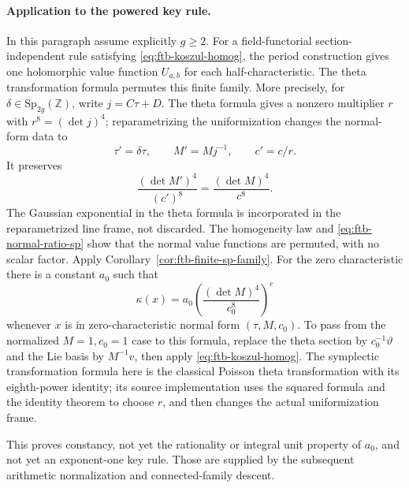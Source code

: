 \paragraph{Application to the powered key rule.}
In this paragraph assume explicitly \(g\geq2\).
For a field-functorial section-independent rule satisfying
\eqref{eq:ftb-koszul-homog}, the period construction gives one
holomorphic value function \(U_{a,b}\) for each half-characteristic.
The theta transformation formula permutes this finite family.
More precisely, for \(\delta\in\mathrm{Sp}_{2g}(\mathbb Z)\),
write \(j=C\tau+D\).  The theta formula gives a nonzero multiplier
\(r\) with \(r^8=(\det j)^4\); reparametrizing the uniformization
changes the normal-form data to
\[
        \tau'=\delta\tau,\qquad M'=Mj^{-1},\qquad c'=c/r.
\]
It preserves
\[
                         \frac{(\det M')^4}{(c')^8}
                             =\frac{(\det M)^4}{c^8}.
 \tag{W10}\label{eq:ftb-normal-ratio-sp}
\]
The Gaussian exponential in the theta formula is incorporated
in the reparametrized line frame, not discarded.
The homogeneity law and \eqref{eq:ftb-normal-ratio-sp} show that
the normal value functions are permuted, with no scalar factor.
Apply Corollary~\ref{cor:ftb-finite-sp-family}.
For the zero characteristic there is a constant \(a_0\) such that
\[
             \kappa(x)=a_0
                    \left(\frac{(\det M)^4}{c_0^8}\right)^c
 \tag{W11}\label{eq:ftb-key-unscaled-constant}
\]
whenever \(x\) is in zero-characteristic normal form
\((\tau,M,c_0)\).
To pass from the normalized \(M=1,c_0=1\) case to this formula,
replace the theta section by \(c_0^{-1}\vartheta\) and the Lie
basis by \(M^{-1}v\), then apply
\eqref{eq:ftb-koszul-homog}.
The symplectic transformation formula here is the classical
Poisson theta transformation with its eighth-power identity;
its source implementation uses the squared formula and the
identity theorem to choose \(r\), and then changes the actual
uniformization frame.

This proves constancy, not yet the rationality or integral unit
property of \(a_0\), and not yet an exponent-one key rule.
Those are supplied by the subsequent arithmetic normalization
and connected-family descent.

